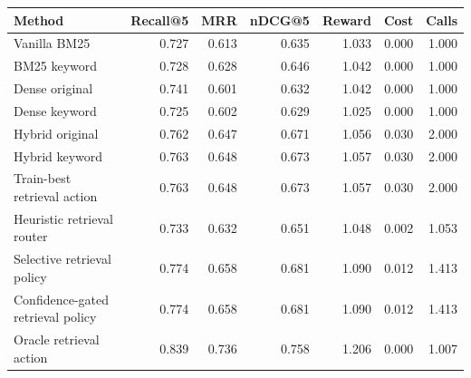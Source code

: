 \begin{tabular}{lrrrrrr}
\toprule
Method & Recall@5 & MRR & nDCG@5 & Reward & Cost & Calls \\
\midrule
Vanilla BM25 & 0.727 & 0.613 & 0.635 & 1.033 & 0.000 & 1.000 \\
BM25 keyword & 0.728 & 0.628 & 0.646 & 1.042 & 0.000 & 1.000 \\
Dense original & 0.741 & 0.601 & 0.632 & 1.042 & 0.000 & 1.000 \\
Dense keyword & 0.725 & 0.602 & 0.629 & 1.025 & 0.000 & 1.000 \\
Hybrid original & 0.762 & 0.647 & 0.671 & 1.056 & 0.030 & 2.000 \\
Hybrid keyword & 0.763 & 0.648 & 0.673 & 1.057 & 0.030 & 2.000 \\
Train-best retrieval action & 0.763 & 0.648 & 0.673 & 1.057 & 0.030 & 2.000 \\
Heuristic retrieval router & 0.733 & 0.632 & 0.651 & 1.048 & 0.002 & 1.053 \\
Selective retrieval policy & 0.774 & 0.658 & 0.681 & 1.090 & 0.012 & 1.413 \\
Confidence-gated retrieval policy & 0.774 & 0.658 & 0.681 & 1.090 & 0.012 & 1.413 \\
Oracle retrieval action & 0.839 & 0.736 & 0.758 & 1.206 & 0.000 & 1.007 \\
\bottomrule
\end{tabular}
